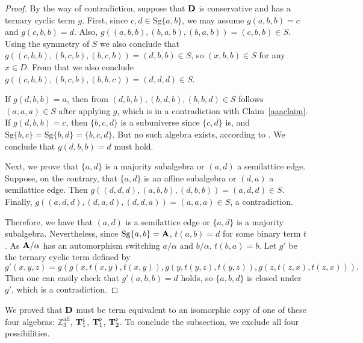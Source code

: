\documentclass[11pt]{amsart}
\newcommand{\m}[1]{\mathbf{\uppercase{#1}}}
\theoremstyle{definition}
\theoremstyle{remark}
\theoremstyle{plain}
\begin{document}
\begin{proof}
By the way of contradiction, suppose that $\m d$ is conservative and has a ternary cyclic term $g$. First, since $c,d\in\mathrm{Sg}\{a,b\}$, we may assume $g(a,b,b)=c$ and $g(c,b,b)=d$. Also, $g((a,b,b),(b,a,b),(b,a,b))=(c,b,b)\in S$. Using the symmetry of $S$ we also conclude that $g((c,b,b),(b,c,b),(b,c,b))=(d,b,b)\in S$, so $(x,b,b)\in S$ for any $x\in D$. From that we also conclude $g((c,b,b),(b,c,b),(b,b,c))=(d,d,d)\in S$.

If $g(d,b,b)=a$, then from $(d,b,b), (b,d,b),(b,b,d)\in S$ follows $(a,a,a)\in S$ after applying $g$, which is in a contradiction with Claim~\ref{aaaclaim}. If $g(d,b,b)=c$, then $\{b,c,d\}$ is a subuniverse since $\{c,d\}$ is, and $\mathrm{Sg}\{b,c\}=\mathrm{Sg}\{b,d\}=\{b,c,d\}$. But no such algebra exists, according to . We conclude that $g(d,b,b)=d$ must hold.

Next, we prove that $\{a,d\}$ is a majority subalgebra or $(a,d)$ a semilattice edge. Suppose, on the contrary, that $\{a,d\}$ is an affine subalgebra or $(d,a)$ a semilattice edge. Then $g((d,d,d),(a,b,b),(d,b,b))=(a,d,d)\in S$. Finally, $g((a,d,d),(d,a,d),(d,d,a))=(a,a,a)\in S$, a contradiction. 

Therefore, we have that $(a,d)$ is a semilattice edge or $\{a,d\}$ is a majority subalgebra. Nevertheless, since $\mathrm{Sg}\{a,b\}=\m a$, $t(a,b)=d$ for some binary term $t$. As $\m a/\alpha$ has an automorphism switching $a/\alpha$ and $b/\alpha$, $t(b,a)=b$. Let $g'$ be the ternary cyclic term defined by \[g'(x,y,z)=g(g(x,t(x,y),t(x,y)),g(y,t(y,z),t(y,z)),g(z,t(z,x),t(z,x))).\]
Then one can easily check that $g'(a,b,b)=d$ holds, so $\{a,b,d\}$ is closed under $g'$, which is a contradiction. 
\end{proof}

We proved that $\m d$ must be term equivalent to an isomorphic copy of one of these four algebras: $\mathbb{Z}^{\text{aff}}_3$, $\m t_1^{\scriptscriptstyle{\mathsf{S}}}$, $\m t_1^{\scriptscriptstyle{\mathsf{P}}}$, $\m t_2^{\scriptscriptstyle{\mathsf{P}}}$. To conclude the subsection, we exclude all four possibilities.
\end{document}
